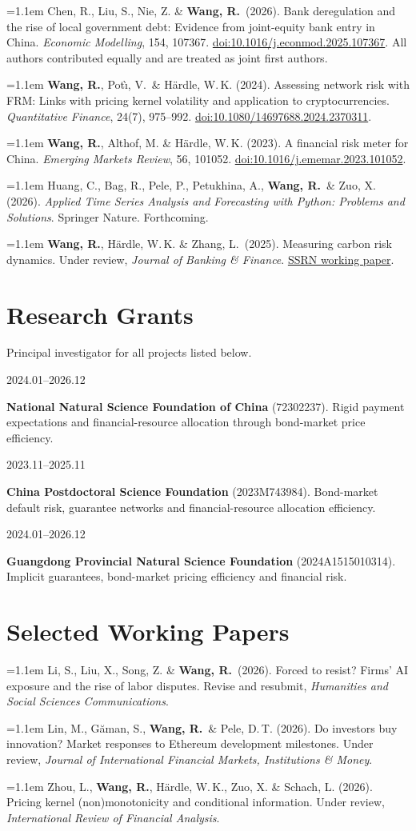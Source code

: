 \documentclass[11pt]{article}
\newcommand{\RW}{\textbf{Wang, R.}}
\newcommand{\corr}{\raisebox{0.55ex}{\sff\fontsize{6.5}{6.5}\selectfont*}}
\newcommand{\pubitem}[1]{%
  \par\begingroup\sloppy\noindent\fontsize{9.35}{12.35}\selectfont%
  \hangindent=1.1em\hangafter=1 #1\par\endgroup\addvspace{3.5pt}}
\newcommand{\cvrow}[2]{%
  \par\noindent\needspace{2\baselineskip}%
  \begin{minipage}[t]{0.17\linewidth}\raggedright\sff\footnotesize\color{plum}#1\end{minipage}%
  \hfill\begin{minipage}[t]{0.81\linewidth}#2\end{minipage}%
  \par\addvspace{5.2pt}}
\begin{document}
\pubitem{Chen, R., Liu, S.\corr, Nie, Z. \& \RW\ (2026). Bank deregulation and the rise of
local government debt: Evidence from joint-equity bank entry in China.
\textit{Economic Modelling}, 154, 107367.
\href{https://doi.org/10.1016/j.econmod.2025.107367}{doi:10.1016/j.econmod.2025.107367}.
All authors contributed equally and are treated as joint first authors.}

\pubitem{\RW, Pot\`\i, V.\corr\ \& H\"ardle, W.\,K. (2024). Assessing network risk with FRM:
Links with pricing kernel volatility and application to cryptocurrencies.
\textit{Quantitative Finance}, 24(7), 975--992.
\href{https://doi.org/10.1080/14697688.2024.2370311}{doi:10.1080/14697688.2024.2370311}.}

\pubitem{\RW\corr, Althof, M. \& H\"ardle, W.\,K. (2023). A financial risk meter for China.
\textit{Emerging Markets Review}, 56, 101052.
\href{https://doi.org/10.1016/j.ememar.2023.101052}{doi:10.1016/j.ememar.2023.101052}.}

\pubitem{Huang, C., Bag, R., Pele, P., Petukhina, A., \RW\ \& Zuo, X. (2026).
\textit{Applied Time Series Analysis and Forecasting with Python: Problems and Solutions}.
Springer Nature. Forthcoming.}

\pubitem{\RW, H\"ardle, W.\,K. \& Zhang, L.\corr\ (2025). Measuring carbon risk dynamics.
Under review, \textit{Journal of Banking \& Finance}.
\href{https://papers.ssrn.com/sol3/papers.cfm?abstract_id=6916243}{SSRN working paper}.}

\section{Research Grants}
{\footnotesize\color{muted}Principal investigator for all projects listed below.}
\par\vspace{4pt}
\cvrow{2024.01--2026.12}{\textbf{National Natural Science Foundation of China} (72302237).
Rigid payment expectations and financial-resource allocation through bond-market price efficiency.}
\cvrow{2023.11--2025.11}{\textbf{China Postdoctoral Science Foundation} (2023M743984).
Bond-market default risk, guarantee networks and financial-resource allocation efficiency.}
\cvrow{2024.01--2026.12}{\textbf{Guangdong Provincial Natural Science Foundation}
(2024A1515010314). Implicit guarantees, bond-market pricing efficiency and financial risk.}

\section{Selected Working Papers}
\pubitem{Li, S., Liu, X.\corr, Song, Z. \& \RW\ (2026). Forced to resist? Firms' AI exposure
and the rise of labor disputes. Revise and resubmit, \textit{Humanities and Social Sciences Communications}.}
\pubitem{Lin, M., G\u{a}man, S., \RW\corr\ \& Pele, D.\,T. (2026). Do investors buy innovation?
Market responses to Ethereum development milestones. Under review,
\textit{Journal of International Financial Markets, Institutions \& Money}.}
\pubitem{Zhou, L., \RW\corr, H\"ardle, W.\,K., Zuo, X. \& Schach, L. (2026). Pricing kernel
(non)monotonicity and conditional information. Under review,
\textit{International Review of Financial Analysis}.}
\end{document}

